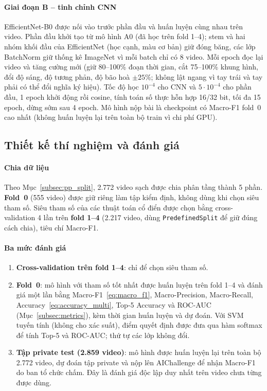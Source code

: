\paragraph*{Giai đoạn B -- tinh chỉnh CNN} EfficientNet-B0 được nối vào trước phần đầu và huấn luyện cùng nhau trên video. Phần đầu khởi tạo từ mô hình A0 (đã học trên fold 1--4); stem và hai nhóm khối đầu của EfficientNet (học cạnh, màu cơ bản) giữ đóng băng, các lớp BatchNorm giữ thống kê ImageNet vì mỗi batch chỉ có 8 video. Mỗi epoch đọc lại video và tăng cường mới (giữ 80--100\% đoạn thời gian, cắt 75--100\% khung hình, đổi độ sáng, độ tương phản, độ bão hoà $\pm25\%$; không lật ngang vì tay trái và tay phải có thể đổi nghĩa ký hiệu). Tốc độ học $10^{-4}$ cho CNN và $5\cdot10^{-4}$ cho phần đầu, 1 epoch khởi động rồi cosine, tính toán số thực hỗn hợp 16/32 bit, tối đa 15 epoch, dừng sớm sau 4 epoch. Mô hình nộp bài là checkpoint có Macro-F1 fold~0 cao nhất (không huấn luyện lại trên toàn bộ train vì chi phí GPU).

\subsection{Thiết kế thí nghiệm và đánh giá}
\label{subsec:eval_design}

\paragraph*{Chia dữ liệu} Theo Mục~\ref{subsec:pp_split}, 2.772 video sạch được chia phân tầng thành 5 phần. \textbf{Fold~0} (555 video) được giữ riêng làm tập kiểm định, không dùng khi chọn siêu tham số. Siêu tham số của các thuật toán cổ điển được chọn bằng cross-validation 4 lần trên \textbf{fold 1--4} (2.217 video, dùng \texttt{PredefinedSplit} để giữ đúng cách chia), tiêu chí Macro-F1.

\paragraph*{Ba mức đánh giá}
\begin{enumerate}
  \item \textbf{Cross-validation trên fold 1--4}: chỉ để chọn siêu tham số.
  \item \textbf{Fold~0}: mô hình với tham số tốt nhất được huấn luyện trên fold 1--4 và đánh giá một lần bằng Macro-F1~\eqref{eq:macro_f1}, Macro-Precision, Macro-Recall, Accuracy~\eqref{eq:accuracy_multi}, Top-5 Accuracy và ROC-AUC (Mục~\ref{subsec:metrics}), kèm thời gian huấn luyện và dự đoán. Với SVM tuyến tính (không cho xác suất), điểm quyết định được đưa qua hàm softmax để tính Top-5 và ROC-AUC; thứ tự các lớp không đổi.
  \item \textbf{Tập private test (2.859 video)}: mô hình được huấn luyện lại trên toàn bộ 2.772 video, dự đoán tập private và nộp lên AIChallenge để nhận Macro-F1 do ban tổ chức chấm. Đây là đánh giá độc lập duy nhất trên video chưa từng được dùng.
\end{enumerate}

